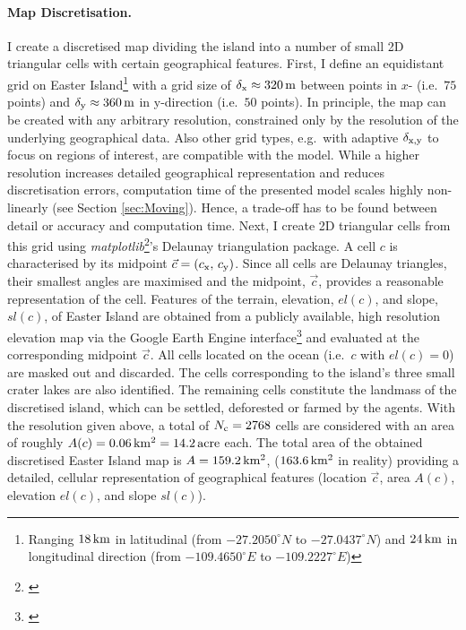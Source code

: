 \paragraph{Map Discretisation.}
I create a discretised map dividing the island into a number of small 2D triangular cells with certain geographical features.
First, I define an equidistant grid on Easter Island\footnote{Ranging $18\, {\rm km}$ in latitudinal (from $-27.2050^\circ N$ to $-27.0437^\circ N$) and $24\, {\rm km}$ in longitudinal direction (from  $-109.4650^\circ E$ to 
 $-109.2227^\circ E$)} with a grid size of $\delta_{\rm x} \approx 320\, {\rm m}$ between points in $x$- (i.e.\ $75$ points) and $\delta_{\rm y} \approx 360\, {\rm m}$ in y-direction (i.e.\ $50$ points). 
In principle, the map can be created with any arbitrary resolution, constrained only by the resolution of the underlying geographical data. 
Also other grid types, e.g.\ with adaptive $\delta_{\rm x,y}$ to focus on regions of interest, are compatible with the model. 
While a higher resolution increases detailed geographical representation and reduces discretisation errors, computation time of the presented model scales highly non-linearly (see Section \ref{sec:Moving}).
Hence, a trade-off has to be found between detail or accuracy and computation time.
Next, I create 2D triangular cells from this grid using \textit{matplotlib}\footnote{\citet{matplotlib}}'s Delaunay triangulation package.
A cell $c$ is characterised by its midpoint $\vec{c} = (c_{\rm x},\, c_{\rm y})$. 
Since all cells are Delaunay triangles, their smallest angles are maximised and the midpoint, $\vec{c}$, provides a reasonable representation of the cell.
Features of the terrain, elevation, $el(c)$, and slope, $sl(c)$, of Easter Island are obtained from a publicly available, high resolution elevation map \citep{Jarvis2008CIGAR} via the Google Earth Engine interface\footnote{\citet{gorelick2017google}} and evaluated at the corresponding midpoint $\vec{c}$.
All cells located on the ocean (i.e.\ $c$ with $el(c)=0$) are masked out and discarded.
The cells corresponding to the island's three small crater lakes are also identified.
The remaining cells constitute the landmass of the discretised island, which can be settled, deforested or farmed by the agents. 
With the resolution given above, a total of $N_{\rm c} = 2768$ cells are considered with an area of roughly $A(c)= 0.06 \, {\rm km^2} = 14.2 \, {\rm acre}$ each.
The total area of the obtained discretised Easter Island map is $A=159.2\, {\rm km^2}$, ($163.6\, {\rm km^2}$ in reality) providing a detailed, cellular representation of geographical features (location $\vec{c}$, area $A(c)$, elevation $el(c)$, and slope $sl(c)$).


